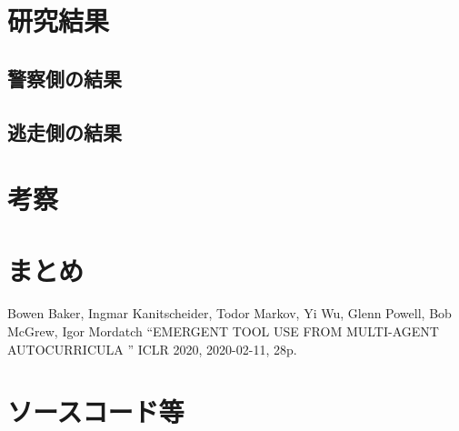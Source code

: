 \documentclass[dvipdfmx]{jsarticle}
\begin{document}
\section{研究結果}
    \subsection{警察側の結果}
    \subsection{逃走側の結果}
\section{考察}
\section{まとめ}
\begin{thebibliography}{99}
     Bowen Baker, Ingmar Kanitscheider, Todor Markov, Yi Wu, Glenn Powell, Bob McGrew, Igor Mordatch 
    “EMERGENT TOOL USE FROM MULTI-AGENT AUTOCURRICULA ”
    ICLR 2020, 2020-02-11, 28p.


\end{thebibliography}
\section{ソースコード等}
\end{document}
